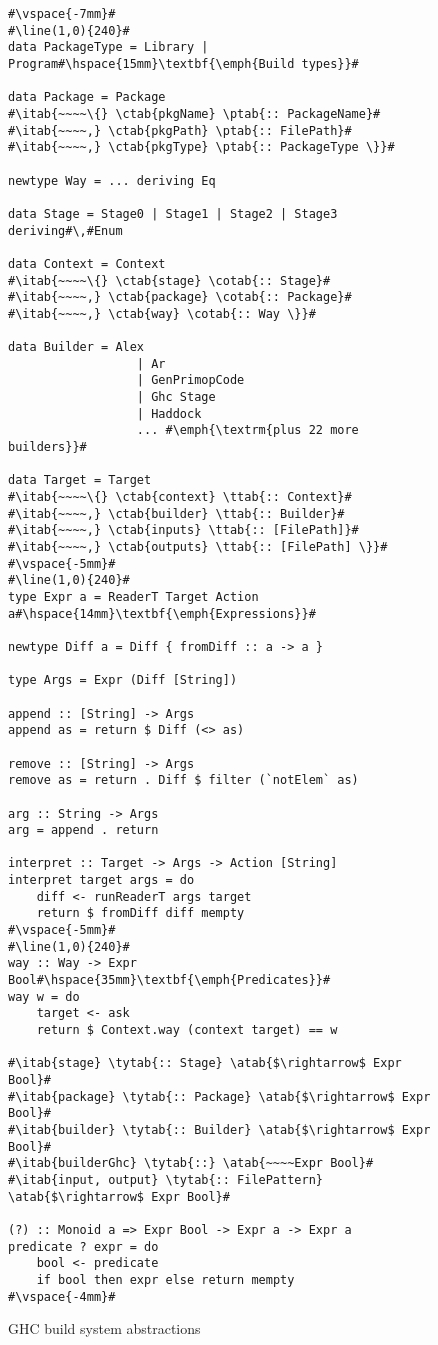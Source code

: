 \begin{figure}
\begin{lstlisting}
#\vspace{-7mm}#
#\line(1,0){240}#
data PackageType = Library | Program#\hspace{15mm}\textbf{\emph{Build types}}#

data Package = Package
#\itab{~~~~\{} \ctab{pkgName} \ptab{:: PackageName}#
#\itab{~~~~,} \ctab{pkgPath} \ptab{:: FilePath}#
#\itab{~~~~,} \ctab{pkgType} \ptab{:: PackageType \}}#

newtype Way = ... deriving Eq

data Stage = Stage0 | Stage1 | Stage2 | Stage3 deriving#\,#Enum

data Context = Context
#\itab{~~~~\{} \ctab{stage} \cotab{:: Stage}#
#\itab{~~~~,} \ctab{package} \cotab{:: Package}#
#\itab{~~~~,} \ctab{way} \cotab{:: Way \}}#

data Builder = Alex
                  | Ar
                  | GenPrimopCode
                  | Ghc Stage
                  | Haddock
                  ... #\emph{\textrm{plus 22 more builders}}#

data Target = Target
#\itab{~~~~\{} \ctab{context} \ttab{:: Context}#
#\itab{~~~~,} \ctab{builder} \ttab{:: Builder}#
#\itab{~~~~,} \ctab{inputs} \ttab{:: [FilePath]}#
#\itab{~~~~,} \ctab{outputs} \ttab{:: [FilePath] \}}#
#\vspace{-5mm}#
#\line(1,0){240}#
type Expr a = ReaderT Target Action a#\hspace{14mm}\textbf{\emph{Expressions}}#

newtype Diff a = Diff { fromDiff :: a -> a }

type Args = Expr (Diff [String])

append :: [String] -> Args
append as = return $ Diff (<> as)

remove :: [String] -> Args
remove as = return . Diff $ filter (`notElem` as)

arg :: String -> Args
arg = append . return

interpret :: Target -> Args -> Action [String]
interpret target args = do
    diff <- runReaderT args target
    return $ fromDiff diff mempty
#\vspace{-5mm}#
#\line(1,0){240}#
way :: Way -> Expr Bool#\hspace{35mm}\textbf{\emph{Predicates}}#
way w = do
    target <- ask
    return $ Context.way (context target) == w

#\itab{stage} \tytab{:: Stage} \atab{$\rightarrow$ Expr Bool}#
#\itab{package} \tytab{:: Package} \atab{$\rightarrow$ Expr Bool}#
#\itab{builder} \tytab{:: Builder} \atab{$\rightarrow$ Expr Bool}#
#\itab{builderGhc} \tytab{::} \atab{~~~~Expr Bool}#
#\itab{input, output} \tytab{:: FilePattern} \atab{$\rightarrow$ Expr Bool}#

(?) :: Monoid a => Expr Bool -> Expr a -> Expr a
predicate ? expr = do
    bool <- predicate
    if bool then expr else return mempty
#\vspace{-4mm}#
\end{lstlisting}
\caption{GHC build system abstractions\label{fig:abstractions}}
\end{figure}

